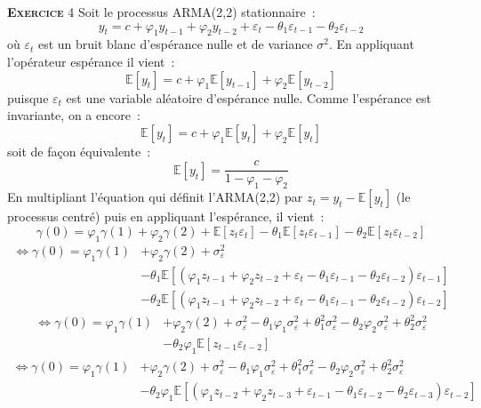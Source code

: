 \documentclass[10pt,a4paper,notitlepage,onecolumn]{article}
\newcommand{\expectation}[1]{\mathbb E \left[ #1 \right]}
\newcommand{\exercice}[1]{\textsc{\textbf{Exercice}} #1}
\begin{document}
\exercice{4} Soit le processus ARMA(2,2) stationnaire :
\[
y_t = c + \varphi_1 y_{t-1} + \varphi_2 y_{t-2} + \varepsilon_t - \theta_1 \varepsilon_{t-1} - \theta_2 \varepsilon_{t-2}
\]
où $\varepsilon_t$ est un bruit blanc d'espérance nulle et de variance $\sigma^2$. En appliquant l'opérateur espérance il vient :
\[
\expectation{y_t} = c + \varphi_1 \expectation{y_{t-1}} + \varphi_2 \expectation{y_{t-2}}
\]
puisque $\varepsilon_t$ est une variable aléatoire d'espérance nulle. Comme l'espérance est invariante, on a encore :
\[
\expectation{y_t} = c + \varphi_1 \expectation{y_{t}} + \varphi_2 \expectation{y_{t}}
\]
soit de façon équivalente :
\[
\expectation{y_t} = \frac{c}{1-\varphi_1-\varphi_2}
\]
En multipliant l'équation qui définit l'ARMA(2,2) par $z_t = y_t-\expectation{y_t}$ (le processus centré) puis en appliquant l'espérance, il vient :
\[
\gamma(0) = \varphi_1 \gamma(1) + \varphi_2 \gamma(2) + \expectation{z_t\varepsilon_t} - \theta_1\expectation{z_t\varepsilon_{t-1}} - \theta_2\expectation{z_t\varepsilon_{t-2}}
\]
\[
\begin{split}
\Leftrightarrow \gamma(0) = \varphi_1 \gamma(1) &+ \varphi_2 \gamma(2) + \sigma_{\varepsilon}^2\\ 
&- \theta_1\expectation{\left(\varphi_1 z_{t-1} + \varphi_2 z_{t-2} + \varepsilon_t - \theta_1 \varepsilon_{t-1} - \theta_2 \varepsilon_{t-2}\right)\varepsilon_{t-1}}\\
&- \theta_2\expectation{\left(\varphi_1 z_{t-1} + \varphi_2 z_{t-2} + \varepsilon_t - \theta_1 \varepsilon_{t-1} - \theta_2 \varepsilon_{t-2}\right)\varepsilon_{t-2}}  
\end{split}
\]
\[
\begin{split}
\Leftrightarrow \gamma(0) = \varphi_1 \gamma(1) &+ \varphi_2 \gamma(2) + \sigma_{\varepsilon}^2 -\theta_1\varphi_1\sigma_{\varepsilon}^2 + \theta_1^2\sigma_{\varepsilon}^2 -\theta_2\varphi_2\sigma_{\varepsilon}^2+ \theta_2^2\sigma_{\varepsilon}^2\\ 
&- \theta_2\varphi_1 \expectation{z_{t-1}\varepsilon_{t-2}}  
\end{split}
\]
\[
\begin{split}
\Leftrightarrow \gamma(0) = \varphi_1 \gamma(1) &+ \varphi_2 \gamma(2) + \sigma_{\varepsilon}^2 -\theta_1\varphi_1\sigma_{\varepsilon}^2 + \theta_1^2\sigma_{\varepsilon}^2 -\theta_2\varphi_2\sigma_{\varepsilon}^2+ \theta_2^2\sigma_{\varepsilon}^2\\ 
&- \theta_2\varphi_1 \expectation{\left(\varphi_1 z_{t-2} + \varphi_2 z_{t-3} + \varepsilon_{t-1} - \theta_1 \varepsilon_{t-2} - \theta_2 \varepsilon_{t-3}\right)\varepsilon_{t-2}}  
\end{split}
\]
\end{document}
